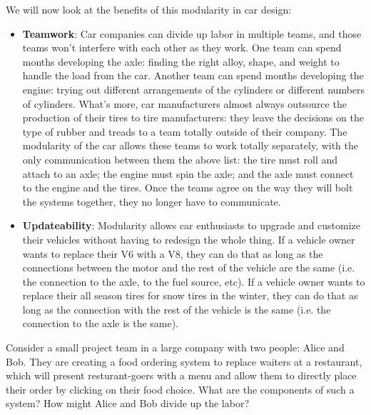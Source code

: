 We will now look at the benefits of this modularity in car design:

\begin{itemize}
	\item \textbf{Teamwork}: Car companies can divide up labor in multiple teams, and those teams won't interfere with each other as they work. One team can spend months developing the axle: finding the right alloy, shape, and weight to handle the load from the car. Another team can spend months developing the engine: trying out different arrangements of the cylinders or different numbers of cylinders. What's more, car manufacturers almost always outsource the production of their tires to tire manufacturers: they leave the decisions on the type of rubber and treads to a team totally outside of their company. The modularity of the car allows these teams to work totally separately, with the only communication between them the above list: the tire must roll and attach to an axle; the engine must spin the axle; and the axle must connect to the engine and the tires. Once the teams agree on the way they will bolt the systems together, they no longer have to communicate. 
    
	\item \textbf{Updateability}: Modularity allows car enthusiasts to upgrade and customize their vehicles without having to redesign the whole thing. If a vehicle owner wants to replace their V6 with a V8, they can do that as long as the connections between the motor and the rest of the vehicle are the same (i.e. the connection to the axle, to the fuel source, etc). If a vehicle owner wants to replace their all season tires for snow tires in the winter, they can do that as long as the connection with the rest of the vehicle is the same (i.e. the connection to the axle is the same). 
\end{itemize}

\begin{example}
Consider a small project team in a large company with two people: Alice and Bob. They are creating a food ordering system to replace waiters at a restaurant, which will present resturant-goers with a menu and allow them to directly place their order by clicking on their food choice. What are the components of such a system? How might Alice and Bob divide up the labor? 
\end{example}

